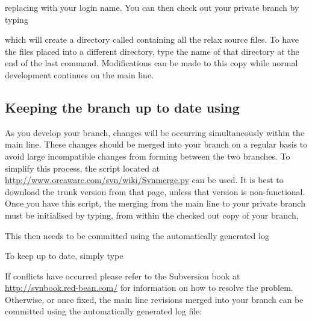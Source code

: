 replacing  with your login name.
You can then check out your private branch by typing


which will create a directory called  containing all the relax source files.
To have the files placed into a different directory, type the name of that directory at the end of the last command.
Modifications can be made to this copy while normal development continues on the main line.


\subsection{Keeping the branch up to date using }

As you develop your branch, changes will be occurring simultaneously within the main line.
These changes should be merged into your branch on a regular basis to avoid large incompatible changes from forming between the two branches.
To simplify this process, the  script located at \href{http://www.orcaware.com/svn/wiki/Svnmerge.py}{http://www.orcaware.com/svn/wiki/Svnmerge.py} can be used.
It is best to download the trunk version from that page, unless that version is non-functional.
Once you have this script, the merging from the main line to your private branch must be initialised by typing, from within the checked out copy of your branch,


This then needs to be committed using the automatically generated log


To keep up to date, simply type



If conflicts have occurred please refer to the Subversion book at \href{http://svnbook.red-bean.com/}{http://svnbook.red-bean.com/} for information on how to resolve the problem.
Otherwise, or once fixed, the main line revisions merged into your branch can be committed using the automatically generated log file:



